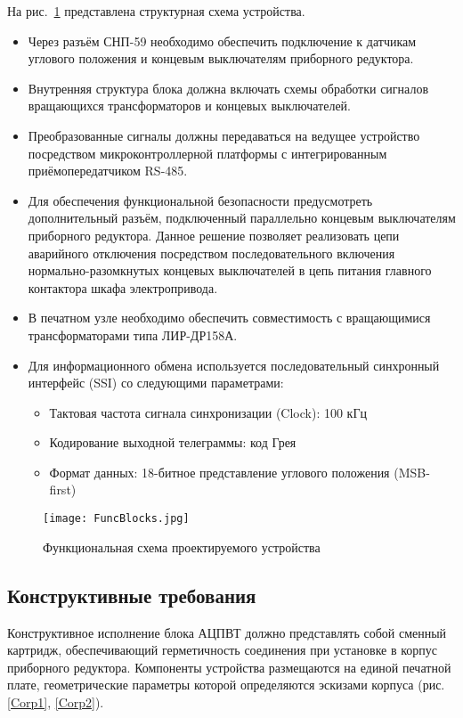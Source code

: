     На рис.~\ref{FuncBlocks} представлена структурная схема устройства. 
    \begin{itemize}
    \item Через разъём СНП-59  необходимо обеспечить подключение к датчикам углового положения и концевым выключателям приборного редуктора. 

    \item Внутренняя структура блока должна включать схемы обработки сигналов вращающихся трансформаторов и концевых выключателей. 

    \item Преобразованные сигналы должны передаваться на ведущее устройство посредством микроконтроллерной платформы с интегрированным приёмопередатчиком RS-485.
    
    \item Для обеспечения функциональной безопасности предусмотреть дополнительный разъём, подключенный параллельно концевым выключателям приборного редуктора. 
    Данное решение позволяет реализовать цепи аварийного отключения посредством последовательного включения нормально-разомкнутых концевых выключателей 
    в цепь питания главного контактора шкафа электропривода.


    \item В печатном узле необходимо обеспечить совместимость с вращающимися трансформаторами типа ЛИР-ДР158А.

    \item Для информационного обмена используется последовательный синхронный интерфейс (SSI) со следующими параметрами:
    \begin{itemize}
        \item Тактовая частота сигнала синхронизации (Clock): 100 кГц
        \item Кодирование выходной телеграммы: код Грея
        \item Формат данных: 18-битное представление углового положения (MSB-first)
    \end{itemize}
\end{itemize}

 \begin{figure}[!ht]
        \centering
        \texttt{[image: FuncBlocks.jpg]}
        \caption{Функциональная схема проектируемого устройства}
        \label{FuncBlocks}
    \end{figure}

\subsection{Конструктивные требования}
Конструктивное исполнение блока АЦПВТ должно представлять собой сменный картридж, обеспечивающий герметичность соединения при установке в корпус приборного 
редуктора. Компоненты устройства размещаются на единой печатной плате, 
геометрические параметры которой определяются эскизами корпуса (рис. \ref{Corp1}, \ref{Corp2}).

